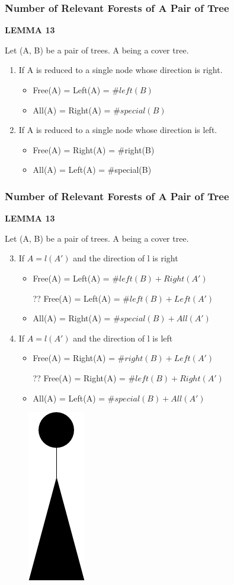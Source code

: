\documentclass{beamer}
\begin{document}
\begin{frame}
\frametitle{Number of Relevant Forests of A Pair of Tree}
\textbf{LEMMA 13}

Let (A, B) be a pair of trees. A being a cover tree.

\begin{enumerate}[1)]
\item If A is reduced to a single node whose direction is right.
\begin{itemize}
\item Free(A) = Left(A) = $\#left(B)$
\item All(A) = Right(A) = $\#special(B)$
\end{itemize}
\item If A is reduced to a single node whose direction is left.
\begin{itemize}
\item Free(A) = Right(A) = \#right(B)
\item All(A) = Left(A) = \#special(B)
\end{itemize}
\end{enumerate}

\end{frame}


\begin{frame}
\frametitle{Number of Relevant Forests of A Pair of Tree}
\textbf{LEMMA 13}

Let (A, B) be a pair of trees. A being a cover tree.

\begin{enumerate}[1)]
\setcounter{enumi}{2}
\item If $A = l(A')$ and the direction of l is right
\begin{itemize}
\item Free(A) = Left(A) = $\#left(B) + Right(A')$

?? Free(A) = Left(A) = $\#left(B) + Left(A')$
\item All(A) = Right(A) = $\#special(B) + All(A')$
\end{itemize}
\item If $A = l(A')$ and the direction of l is left
\begin{itemize}
\item Free(A) = Right(A) = $\#right(B) + Left(A')$

?? Free(A) = Right(A) = $\#left(B) + Right(A')$
\item All(A) = Left(A) = $\#special(B) + All(A')$
\end{itemize}
\end{enumerate}


\begin{figure}
	\includegraphics[width=0.08\linewidth]{lemma131}
	\label{LEMMA 13(1)} 
	\centering
\end{figure}
\end{frame}
\end{document}
